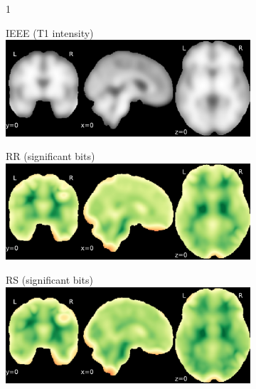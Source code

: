 \documentclass{article}
\begin{document}
\begin{appendices}
\begin{landscape}
\begin{figure}
            \vspace*{-2cm}
            \centering
            \begin{subfigure}[b][][c]{0.01\paperwidth} 1 \vspace*{-45pt} \end{subfigure}
            \begin{subfigure}[t]{0.2\paperheight}
                \centering
                IEEE (T1 intensity)
                \includegraphics[width=\textwidth]{figures/sig/15mm/ieee_ds001600_sub-1.pdf}
            \end{subfigure}
            \begin{subfigure}[t]{0.2\paperheight}
                \centering
                RR (significant bits)
                \includegraphics[width=\textwidth]{figures/sig/15mm/rr_ds001600_sub-1_sig.pdf}
            \end{subfigure}
            \begin{subfigure}[t]{0.2\paperheight}
                \centering
                RS (significant bits)
                \includegraphics[width=\textwidth]{figures/sig/15mm/rs_ds001600_sub-1_sig.pdf}

\end{subfigure}
\end{figure}
\end{landscape}
\end{appendices}
\end{document}
